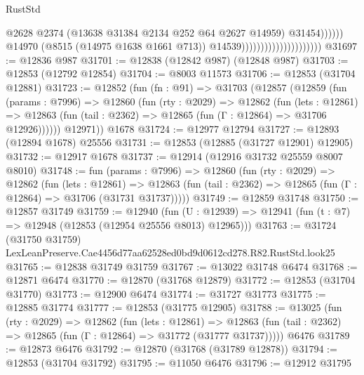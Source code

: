 \begin{lexlean}{RustStd}
\begin{coremodule}
                                                          @2628
                                                          @2374
                                                          (@13638
                                                            @31384
                                                            @2134
                                                            @252
                                                            @64
                                                            @2627
                                                            @14959)
                                                          @31454))))))
                                              @14970
                                              (@8515 (@14975 @1638 @1661 @713))
                                              @14539)))))))))))))))))))))
@31697 := @12836 @987
@31701 := @12838 (@12842 @987) (@12848 @987)
@31703 := @12853 (@12792 @12854)
@31704 := @8003 @11573
@31706 := @12853 (@31704 @12881)
@31723 := @12852
    (fun (fn : @91) =>
    @31703
      (@12857
        (@12859
          (fun (params : @7996) =>
          @12860
            (fun (rty : @2029) =>
            @12862
              (fun (lets : @12861) =>
              @12863 (fun (tail : @2362) => @12865 (fun (Γ : @12864) => @31706 @12926))))))
        @12971))
    @1678
@31724 := @12977 @12794
@31727 := @12893 (@12894 @1678) @25556
@31731 := @12853 (@12885 (@31727 @12901) @12905)
@31732 := @12917 @1678
@31737 := @12914 (@12916 @31732 @25559 @8007 @8010)
@31748 := fun (params : @7996) =>
  @12860
    (fun (rty : @2029) =>
    @12862
      (fun (lets : @12861) =>
      @12863 (fun (tail : @2362) => @12865 (fun (Γ : @12864) => @31706 (@31731 @31737)))))
@31749 := @12859 @31748
@31750 := @12857 @31749
@31759 := @12940
    (fun (U : @12939) => @12941 (fun (t : @7) => @12948 (@12853 (@12954 @25556 @8013) @12965)))
@31763 := @31724
    (@31750 @31759)
    LexLeanPreserve.Cae4456d77aa62528ed0bd9d0612cd278.R82.RustStd.look25
@31765 := @12838 @31749 @31759
@31767 := @13022 @31748 @6474
@31768 := @12871 @6474
@31770 := @12870 (@31768 @12879)
@31772 := @12853 (@31704 @31770)
@31773 := @12900 @6474
@31774 := @31727 @31773
@31775 := @12885 @31774
@31777 := @12853 (@31775 @12905)
@31788 := @13025
    (fun (rty : @2029) =>
    @12862
      (fun (lets : @12861) =>
      @12863 (fun (tail : @2362) => @12865 (fun (Γ : @12864) => @31772 (@31777 @31737)))))
    @6476
@31789 := @12873 @6476
@31792 := @12870 (@31768 (@31789 @12878))
@31794 := @12853 (@31704 @31792)
@31795 := @11050 @6476
@31796 := @12912 @31795

\end{coremodule}
\end{lexlean}
